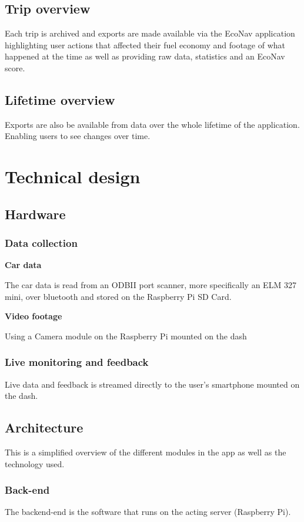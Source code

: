\documentclass[a4paper,12pt]{article}
\begin{document}
\subsection{Trip overview}
Each trip is archived and exports are made available via the EcoNav application highlighting user actions that affected their fuel economy and footage of what happened at the time as well as providing raw data, statistics and an EcoNav score.

\subsection{Lifetime overview}
Exports are also be available from data over the whole lifetime of the application. Enabling users to see changes over time.

\pagebreak

\section{Technical design}
\subsection{Hardware}

\subsubsection{Data collection}
\textbf{Car data}
	
	The car data is read from an ODBII port scanner, more specifically an ELM 327 mini, over bluetooth and stored on the Raspberry Pi SD Card.
	
	
\textbf{Video footage}
	
Using a Camera module on the Raspberry Pi mounted on the dash

\subsubsection{Live monitoring and feedback}
Live data and feedback is streamed directly to the user's smartphone mounted on the dash.

\pagebreak

\subsection{Architecture}
This is a simplified overview of the different modules in the app as well as the technology used.
\subsubsection{Back-end}
The backend-end is the software that runs on the acting server (Raspberry Pi). 
\end{document}
